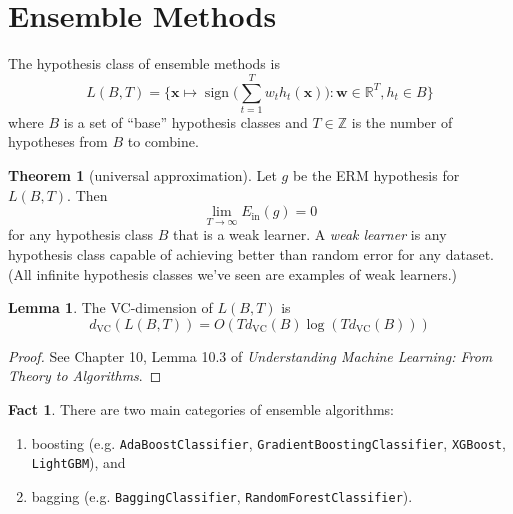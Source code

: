 \documentclass[10pt]{exam}
\theoremstyle{definition}
\newtheorem{problem}{Problem}
\newtheorem{lemma}{Lemma}
\newtheorem{fact}{Fact}
\newtheorem{theorem}{Theorem}
\newcommand{\R}{\mathbb R}
\DeclareMathOperator{\sign}{sign}
\newcommand{\Ein}{E_{\text{in}}}
\newcommand{\w}{\mathbf w}
\newcommand{\x}{\mathbf x}
\newcommand{\dvc}{{d_{\text{VC}}}}
\begin{document}
\newpage
\section*{Ensemble Methods}

The hypothesis class of ensemble methods is
\begin{equation}
    L(B,T) = \bigg\{ \x \mapsto \sign \bigg(\sum_{t=1}^T w_t h_t(\x)\bigg) : \w \in \R^T, h_t \in B \bigg\}
\end{equation}
where $B$ is a set of ``base'' hypothesis classes and $T\in\mathbb Z$ is the number of hypotheses from $B$ to combine.

\newpage
\begin{theorem}[universal approximation]
    Let $g$ be the ERM hypothesis for $L(B,T)$.
    Then
    \begin{equation}
        \lim_{T\to\infty} \Ein(g) = 0
    \end{equation}
    for any hypothesis class $B$ that is a weak learner.
    A \emph{weak learner} is any hypothesis class capable of achieving better than random error for any dataset.
    (All infinite hypothesis classes we've seen are examples of weak learners.)
\end{theorem}

\begin{lemma}
    The VC-dimension of $L(B,T)$ is
    \begin{equation}
        \dvc(L(B,T)) = O(T \dvc(B) \log(T \dvc(B)))
    \end{equation}
\end{lemma}
\begin{proof}
See Chapter 10, Lemma 10.3 of \emph{Understanding Machine Learning: From Theory to Algorithms}.
\end{proof}


\begin{fact}
There are two main categories of ensemble algorithms:
    \begin{enumerate}
        \item boosting
            (e.g. \lstinline{AdaBoostClassifier}, \lstinline{GradientBoostingClassifier}, \lstinline{XGBoost}, \lstinline{LightGBM}), and
            \vspace{3in}
        \item bagging
            (e.g. \lstinline{BaggingClassifier}, \lstinline{RandomForestClassifier}).
    \end{enumerate}
\end{fact}
\end{document}
